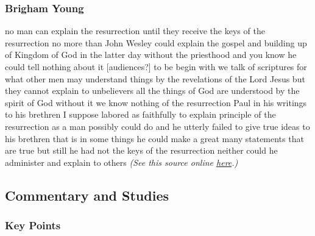 	
	
	\subsubsection{Brigham Young} %
		\label{RESURRECTION-BY}
	
		\begin{compactdesc}
			\item[6 October 1867] no man can explain the resurrection until they receive the keys of the resurrection no more than John Wesley could explain the gospel and building up of Kingdom of God in the latter day without the priesthood and you know he could tell nothing about it [audiences?] to be begin with we talk of scriptures for what other men may understand things by the revelations of the Lord Jesus but they cannot explain to unbelievers all the things of God are understood by the spirit of God without it we know nothing of the resurrection Paul in his writings to his brethren I suppose labored as faithfully to explain principle of the resurrection as a man possibly could do and he utterly failed to give true ideas to his brethren that is in some things he could make a great many statements that are true but still he had not the keys of the resurrection neither could he administer and explain to others \textit{(See this source online \href{https://drive.google.com/file/d/1wV-mRM932G6giTCQENRd8CTtRAMDGdxa/view?usp=sharing}{here}.)}
		\end{compactdesc}
	
\subsection{Commentary and Studies} %
	\label{RESURRECTION-COMMENTARY}

	\subsubsection{Key Points}
		\label{RESURRECTION-KEYS}
	
